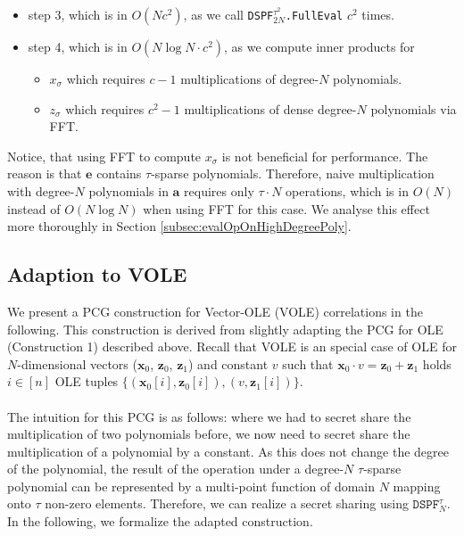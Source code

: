 \begin{itemize}
\item step 3, which is in $O(Nc^2)$, as we call \texttt{DSPF$^{\tau^2}_{2N}$.FullEval} $c^2$ times.
\item step 4, which is in $O(N\log N \cdot c^2)$, as we compute inner products for
\begin{itemize}
\item $x_{\sigma}$ which requires $c-1$ multiplications of degree-$N$ polynomials.
\item $z_{\sigma}$ which requires $c^2-1$ multiplications of dense degree-$N$ polynomials via FFT.
\end{itemize}
\end{itemize}

Notice, that using FFT to compute $x_{\sigma}$ is not beneficial for performance. The reason is that $\boldsymbol{e}$ contains $\tau$-sparse polynomials. Therefore, naive multiplication with degree-$N$ polynomials in $\boldsymbol{a}$ requires only $\tau\cdot N$ operations, which is in $O(N)$ instead of $O(N\log N)$ when using FFT for this case. We analyse this effect more thoroughly in Section \ref{subsec:evalOpOnHighDegreePoly}.

\subsection{Adaption to VOLE}
We present a PCG construction for Vector-OLE (VOLE) correlations in the following. This construction is derived from slightly adapting the PCG for OLE (Construction 1) described above. Recall that VOLE is an special case of OLE for $N$-dimensional vectors ($\mathbf{x}_0$, $\mathbf{z}_0$, $\mathbf{z}_1$) and constant $v$ such that $\mathbf{x}_0\cdot v = \mathbf{z}_0 + \mathbf{z}_1$ holds $i \in [n]$ OLE tuples $\{(\mathbf{x}_0[i], \mathbf{z}_0[i]),(v, \mathbf{z}_1[i])\}$. 
\\\\
The intuition for this PCG is as follows: where we had to secret share the multiplication of two polynomials before, we now need to secret share the multiplication of a polynomial by a constant. As this does not change the degree of the polynomial, the result of the operation under a degree-$N$ $\tau$-sparse polynomial can be represented by a multi-point function of domain $N$ mapping onto $\tau$ non-zero elements. Therefore, we can realize a secret sharing using $\texttt{DSPF}^{\tau}_{N}$. In the following, we formalize the adapted construction.

